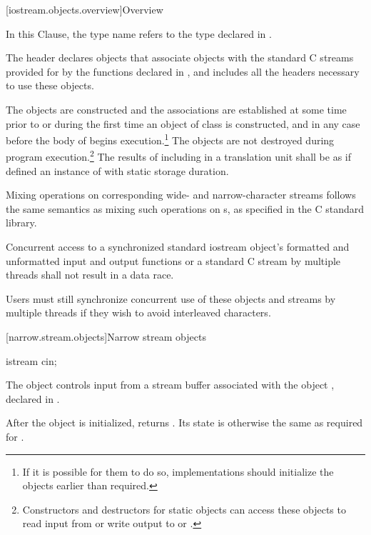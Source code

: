 [iostream.objects.overview]{Overview}

\pnum
In this Clause, the type name  refers to
the type
declared in
%
.

\pnum
The header
declares objects that associate objects with the
standard C streams provided for by the functions declared in
, and includes all the headers necessary to use
these objects.
%

\pnum
The objects are constructed and the associations are established at some
time prior to or during the first time an object of class
 is constructed, and in any case before the body
of  begins execution.\footnote{If it is possible for them to do so, implementations should
initialize the objects earlier than required.}
The objects are not destroyed during program execution.\footnote{Constructors and destructors for static objects can
access these objects to read input from
or write output to
or
.
}
The results of including  in a translation unit shall be as if
 defined an instance of  with static
storage duration.

\pnum
Mixing operations on corresponding wide- and narrow-character streams
follows the same semantics as mixing such operations on
s,
as specified in the C standard library.

\pnum
Concurrent access to a synchronized standard iostream object's formatted and unformatted input and output functions or a standard C stream by multiple threads shall not result in a data race. \begin{note} Users must still synchronize concurrent use of these objects and streams by multiple threads if they wish to avoid interleaved characters. \end{note}


[narrow.stream.objects]{Narrow stream objects}

%
\begin{itemdecl}
istream cin;
\end{itemdecl}

\begin{itemdescr}
\pnum
The object
controls input from a stream buffer
associated with the object
,
declared in
%
.

\pnum
After the object
is initialized,
returns
.
Its state is otherwise the same as required for
.
\end{itemdescr}

